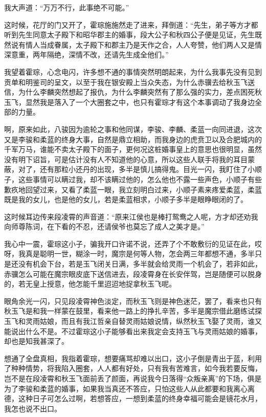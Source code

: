 我大声道：“万万不行，此事绝不可能。”

这时候，花厅的门又开了，霍琮施施然走了进来，拜倒道：“先生，弟子等方才都听到先生同意太子殿下和昭华郡主的婚事，段大公子和秋四公子便是见证，先生既然说有情人当成眷属，太子殿下和郡主乃是天作之合，人人夸赞，他们两人又是情深意重，两年隔绝，深情不改，还请先生成全他们。”

我望着霍琮，心念电闪，许多想不通的事情突然明朗起来，为什么我事先没有见到贡单和明鉴司的呈文，以至于我在银安殿上当众失态，为什么赤骥去给秋玉飞送信，为什么李麟突然想起了报仇，为什么李麟突然有了那么强的实力，差点困死秋玉飞，显然我是落入了一个大圈套之中，也只有霍琮才有这个本事调动了我身边全部的力量。

啊，原来如此，八骏因为逾轮之事和他同谋，李骏、李麟、柔蓝一向同进退，这次又是李骏和柔蓝的终身大事，自然是鼎立相助，而我身边的虎贲卫以及合肥城内的千军万马，谁能不卖太子殿下的面子，更何况这桩婚事皇上的意思也很明显，虽然没有明下诏旨，可是估计没有人不知道他的心意，所以这些人联手将我的耳目蒙蔽，对了，还有那粒小还丹的出现，多半是慎儿搞得鬼。目光一闪，我盯住了小顺子，这些事情可以瞒过我，却不该瞒过他的，怎么他也不露一些声色，小顺子有些歉疚地回望过来，又看了柔蓝一眼，我立刻明白过来，小顺子素来疼爱柔蓝，柔蓝既是我的女儿，也是他的女儿，若是柔蓝相求，小顺子多半是眼睁眼闭的了。

这时候耳边传来段凌霄的声音道：“原来江侯也是棒打鸳鸯之人呢，方才却还劝我向师尊陈词，在下看的不忍，还请侯爷也莫忘了成人之美才是。”

我心中一震，霍琮这小子，骗我开口许诺不说，还弄了个不敢敷衍的见证在此，哎呀，我真是聪明一世，糊涂一时，魔宗是何等人物，怎会两三年都想不通，多半只是还没有机会下台，若是玉飞闭关日满，多半就会给灵雨一个机会了，若非如此，赤骥怎么可能在魔宗眼皮底下送信进去，段凌霄身在长安伴驾，岂是随便可以脱身的，若无皇上授意，他怎能千里迢迢地捉拿秋玉飞呢。

眼角余光一闪，只见段凌霄神色淡定，而秋玉飞则是神色迷茫，罢了，看来也只有秋玉飞是和我一样蒙在鼓里，看来他一路上的挣扎辛苦，多半是魔宗借此磨练试探玉飞和灵雨姑娘，而且有我江哲亲自替灵雨姑娘说情，纵然秋玉飞娶了灵雨，谁又能说出什么不是。不过霍琮这小子能够看出来我定会支持玉飞与灵雨姑娘的婚事，却也是知我甚深了。

想通了全盘真相，我指着霍琮，想要痛骂却难以出口，这小子倒是青出于蓝，利用了种种情势，将我陷入圈套，人人都有好处，只有我有苦难言，如今我若要反悔，岂不是在段凌霄和秋玉飞面前丢了颜面，再说我今日落得“众叛亲离”的下场，俱是为了李骏和柔蓝的婚事，如果我当真还不答应，只怕这些人从此都要和我离心离德，这种日子可怎么过啊，若想答应，一想到柔蓝的终身幸福可能会是镜花水月，我怎也说不出口。

